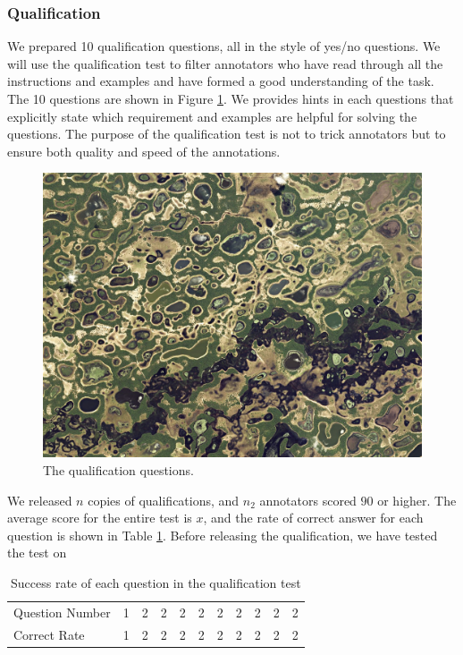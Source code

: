 \subsubsection{Qualification}
We prepared 10 qualification questions, all in the style of yes/no questions. We will use the qualification test to filter annotators who have read through all the instructions and examples and have formed a good understanding of the task. The 10 questions are shown in Figure \ref{v2.qualification.1}. We provides hints in each questions that explicitly state which requirement and examples are helpful for solving the questions. The purpose of the qualification test is not to trick annotators but to ensure both quality and speed of the annotations. 

\begin{figure}[h]
\includegraphics[width=.8\linewidth]{pantanal.jpeg}  
\caption{The qualification questions.}
\label{v2.qualification.1}
\end{figure}

We released $n$ copies of qualifications, and $n_2$ annotators scored $90$ or higher. The average score for the entire test is $x$, and the rate of correct answer for each question is shown in Table \ref{v2.qualification.success_rate}. Before releasing the qualification, we have tested the test on 
\begin{table}[h!]
\begin{minipage}[b]{1\textwidth}
\centering
\begin{tabular}{l|rrrrrrrrrr}
\toprule
Question Number  & 1 & 2 & 2 & 2 & 2 & 2 & 2 & 2 & 2 & 2  \\
Correct Rate  & 1 & 2 & 2 & 2 & 2 & 2 & 2 & 2 & 2 & 2\\
\bottomrule
\end{tabular}
\caption{Success rate of each question in the qualification test}
\label{v2.qualification.success_rate}
\end{minipage}
\end{table}

